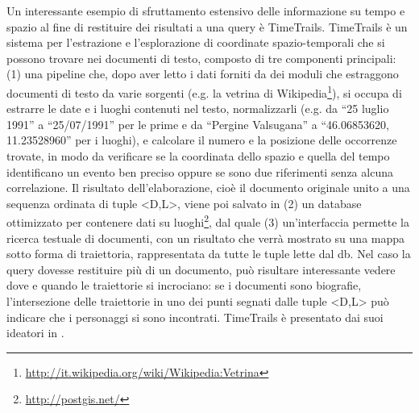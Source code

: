 \documentclass[sigproc-sp.tex]{subfiles}
\begin{document}
Un interessante esempio di sfruttamento estensivo delle informazione su tempo e spazio al fine di restituire dei risultati a una query è TimeTrails. TimeTrails è un sistema per l’estrazione e l’esplorazione di coordinate spazio-temporali che si possono trovare nei documenti di testo, composto di tre componenti principali: (1) una pipeline che, dopo aver letto i dati forniti da dei moduli che estraggono documenti di testo da varie sorgenti (e.g. la vetrina di Wikipedia\footnote{\url{http://it.wikipedia.org/wiki/Wikipedia:Vetrina}}), si occupa di estrarre le date e i luoghi contenuti nel testo, normalizzarli (e.g. da “25 luglio 1991” a “25/07/1991” per le prime e da “Pergine Valsugana” a “46.06853620, 11.23528960” per i luoghi), e calcolare il numero e la posizione delle occorrenze trovate, in modo da verificare se la coordinata dello spazio e quella del tempo identificano un evento ben preciso oppure se sono due riferimenti senza alcuna correlazione. Il risultato dell’elaborazione, cioè il documento originale unito a una sequenza ordinata di tuple <D,L>, viene poi salvato in (2) un database ottimizzato per contenere dati su luoghi\footnote{\url{http://postgis.net/}}, dal quale (3) un’interfaccia permette la ricerca testuale di documenti, con un risultato che verrà mostrato su una mappa sotto forma di traiettoria, rappresentata da tutte le tuple lette dal db. Nel caso la query dovesse restituire più di un documento, può risultare interessante vedere dove e quando le traiettorie si incrociano: se i documenti sono biografie, l’intersezione delle traiettorie in uno dei punti segnati dalle tuple <D,L> può indicare che i personaggi si sono incontrati.
TimeTrails è presentato dai suoi ideatori in \cite{strotgen2010timetrails}.
\end{document}
